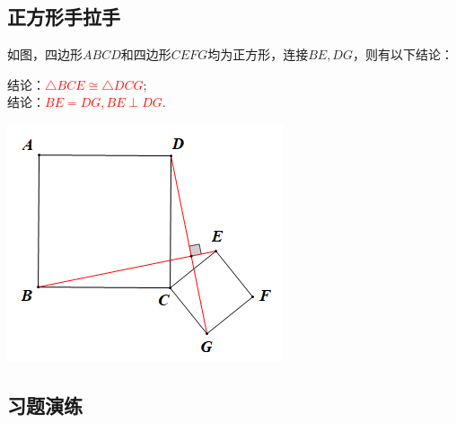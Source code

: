 \subsection{正方形手拉手}
\begin{minipage}{0.6\textwidth}
如图，四边形$ABCD$和四边形$CEFG$均为正方形，连接$BE,DG$，则有以下结论：

结论：\textcolor{red}{$\triangle BCE\cong \triangle DCG$};\\
结论：\textcolor{red}{$BE=DG,BE\perp DG$}.
\end{minipage}
\begin{minipage}{0.4\textwidth}
\includegraphics[scale=0.7]{figure/shoulashou04}
\end{minipage}

\subsection{习题演练}


